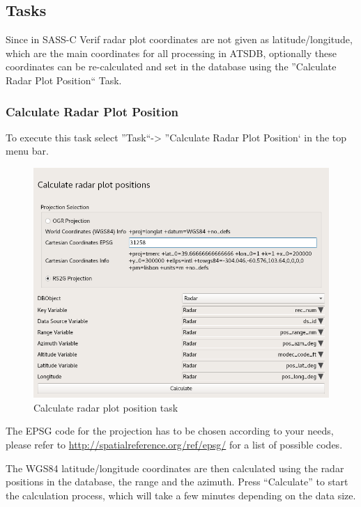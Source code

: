 \subsection{Tasks}
\label{sec:tasks}

Since in SASS-C Verif radar plot coordinates are not given as latitude/longitude, which are the main coordinates for all processing in ATSDB, optionally these coordinates can be re-calculated and set in the database using the ''Calculate Radar Plot Position`` Task.

\subsubsection{Calculate Radar Plot Position}
To execute this task select ''Task``->  ''Calculate Radar Plot Position` in the top menu bar.

\begin{figure}[H]
  \center
    \includegraphics[width=14cm,frame]{../screenshots/task_calc_radar.png}
  \caption{Calculate radar plot position task}
  \label{fig:task_calc_radar}
\end{figure}

The EPSG code for the projection has to be chosen according to your needs, please refer to \url{http://spatialreference.org/ref/epsg/} for a list of possible codes.

The WGS84 latitude/longitude coordinates are then calculated using the radar positions in the database, the range and the azimuth. Press ``Calculate'' to start the calculation process, which will take a few minutes depending on the data size. \\

